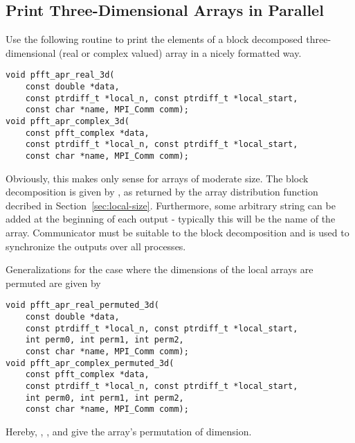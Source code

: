 \subsection{Print Three-Dimensional Arrays in Parallel}
Use the following routine to print the elements of a block decomposed three-dimensional (real or complex valued) array  in a nicely formatted way.
\begin{lstlisting}
void pfft_apr_real_3d(
    const double *data,
    const ptrdiff_t *local_n, const ptrdiff_t *local_start,
    const char *name, MPI_Comm comm);
void pfft_apr_complex_3d(
    const pfft_complex *data,
    const ptrdiff_t *local_n, const ptrdiff_t *local_start,
    const char *name, MPI_Comm comm);
\end{lstlisting}
Obviously, this makes only sense for arrays of moderate size.
The block decomposition is given by ,  as returned
by the array distribution function decribed in Section~\ref{sec:local-size}.
Furthermore, some arbitrary string  can be added at the beginning of each output - typically this will be the name of the array.
Communicator  must be suitable to the block decomposition and is used to synchronize the outputs over all processes.

Generalizations for the case where the dimensions of the local arrays are permuted are given by
\begin{lstlisting}
void pfft_apr_real_permuted_3d(
    const double *data,
    const ptrdiff_t *local_n, const ptrdiff_t *local_start,
    int perm0, int perm1, int perm2,
    const char *name, MPI_Comm comm);
void pfft_apr_complex_permuted_3d(
    const pfft_complex *data,
    const ptrdiff_t *local_n, const ptrdiff_t *local_start,
    int perm0, int perm1, int perm2,
    const char *name, MPI_Comm comm);
\end{lstlisting}
Hereby, , , and  give the array's permutation of dimension.





